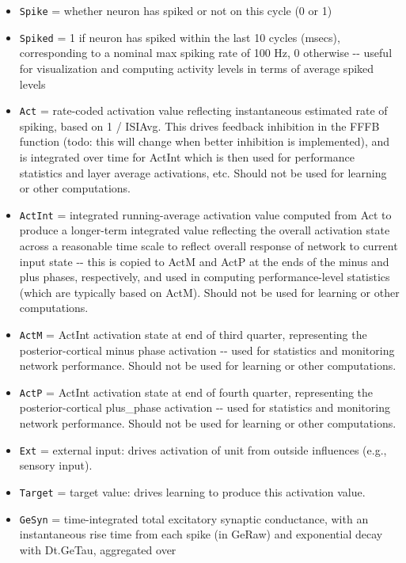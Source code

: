 \documentclass[11pt,twoside]{article}
\newif\myifpdf
\begin{document}
\begin{itemize}
\tightlist
\item
  \texttt{Spike} = whether neuron has spiked or not on this cycle (0 or
  1)
\item
  \texttt{Spiked} = 1 if neuron has spiked within the last 10 cycles
  (msecs), corresponding to a nominal max spiking rate of 100 Hz, 0
  otherwise -\/- useful for visualization and computing activity levels
  in terms of average spiked levels
\item
  \texttt{Act} = rate-coded activation value reflecting instantaneous
  estimated rate of spiking, based on 1 / ISIAvg. This drives feedback
  inhibition in the FFFB function (todo: this will change when better
  inhibition is implemented), and is integrated over time for ActInt
  which is then used for performance statistics and layer average
  activations, etc. Should not be used for learning or other
  computations.
\item
  \texttt{ActInt} = integrated running-average activation value computed
  from Act to produce a longer-term integrated value reflecting the
  overall activation state across a reasonable time scale to reflect
  overall response of network to current input state -\/- this is copied
  to ActM and ActP at the ends of the minus and plus phases,
  respectively, and used in computing performance-level statistics
  (which are typically based on ActM). Should not be used for learning
  or other computations.
\item
  \texttt{ActM} = ActInt activation state at end of third quarter,
  representing the posterior-cortical minus phase activation -\/- used
  for statistics and monitoring network performance. Should not be used
  for learning or other computations.
\item
  \texttt{ActP} = ActInt activation state at end of fourth quarter,
  representing the posterior-cortical plus\_phase activation -\/- used
  for statistics and monitoring network performance. Should not be used
  for learning or other computations.
\item
  \texttt{Ext} = external input: drives activation of unit from outside
  influences (e.g., sensory input).
\item
  \texttt{Target} = target value: drives learning to produce this
  activation value.
\item
  \texttt{GeSyn} = time-integrated total excitatory synaptic
  conductance, with an instantaneous rise time from each spike (in
  GeRaw) and exponential decay with Dt.GeTau, aggregated over

\end{itemize}
\end{document}
